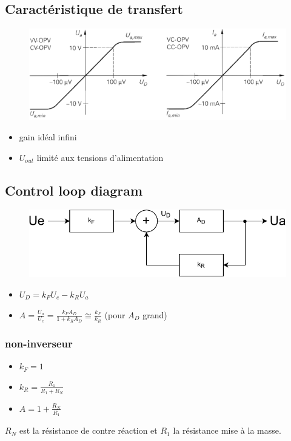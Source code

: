 \documentclass[resume]{subfiles}
\begin{document}
\begin{multicols}{3}
\subsection{Caractéristique de transfert}
\begin{figure}[H]
    \centering
    \includegraphics[width=0.8\columnwidth]{../images/OpAmp1/carTransAOP.png}
\end{figure}
\begin{itemize}
\item gain idéal infini
\item $U_{out}$ limité aux tensions d'alimentation
\end{itemize}

\subsection{Control loop diagram}
\begin{figure}[H]
    \centering
    \includegraphics[width=0.8\columnwidth, page=1]{Schemas-crop.pdf}
\end{figure}

\begin{itemize}
\item $U_D = k_FU_e - k_RU_a$
\item $A = \frac{U_a}{U_e} = \frac{k_FA_D}{1+k_RA_D} \cong \frac{k_F}{k_R}$ (pour $A_D$ grand) 
\end{itemize}

\subsubsection{non-inverseur}
\begin{itemize}
\item $k_F = 1$
\item $k_R = \frac{R_1}{R_1+R_N}$
\item $A = 1+\frac{R_N}{R_1}$
\end{itemize}
$R_N$ est la résistance de contre réaction et $R_1$ la résistance mise à la masse.


\end{multicols}
\end{document}
